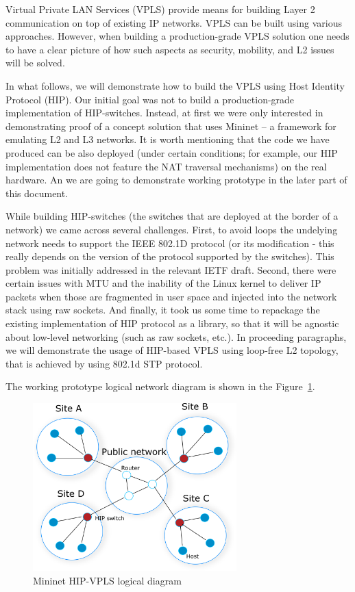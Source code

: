 Virtual Private LAN Services (VPLS) provide means for building Layer 2 communication 
on top of existing IP networks. VPLS can be built using various approaches. However, 
when building a production-grade VPLS solution one needs to have a clear picture of 
how such aspects as security, mobility, and L2 issues will be solved.

In what follows, we will demonstrate how to build the VPLS using Host Identity Protocol (HIP). 
Our initial goal was not to build a production-grade implementation of HIP-switches. Instead, 
at first we were only interested in demonstrating proof of a concept solution that uses 
Mininet – a framework for emulating L2 and L3 networks. It is worth mentioning that the code 
we have produced can be also deployed (under certain conditions; for example, our HIP implementation 
does not feature the NAT traversal mechanisms) on the real hardware. An we are going to demonstrate 
working prototype in the later part of this document.

While building HIP-switches (the switches that are deployed at the border of a network) 
we came across several challenges. First, to avoid loops the undelying network needs to support 
the IEEE 802.1D protocol (or its modification - this really depends on the version of the protocol 
supported by the switches). This problem was initially addressed in the relevant IETF draft. 
Second, there were certain issues with MTU and the inability of the Linux kernel to deliver IP 
packets when those are fragmented in user space and injected into the network stack using raw 
sockets. And finally, it took us some time to repackage the existing implementation of HIP protocol 
as a library, so that it will be agnostic about low-level networking (such as raw sockets, etc.). 
In proceeding paragraphs, we will demonstrate the usage of HIP-based VPLS using loop-free L2 topology,
that is achieved by using 802.1d STP protocol.

The working prototype logical network diagram is shown in the Figure~\ref{fig:mininet}.

\begin{figure}[h!]
    \centering
    \includegraphics[width=0.7\textwidth]{graphics/mininet.png}
    \caption{Mininet HIP-VPLS logical diagram}
    \label{fig:mininet}
\end{figure}

